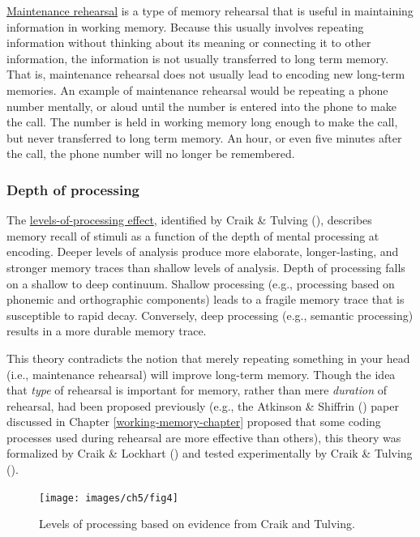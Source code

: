 \documentclass[
]{krantz}
\begin{document}
\hyperref[maintenance-rehearsal]{Maintenance rehearsal} is a type of memory rehearsal that is useful in maintaining information in working memory. Because this usually involves repeating information without thinking about its meaning or connecting it to other information, the information is not usually transferred to long term memory. That is, maintenance rehearsal does not usually lead to encoding new long-term memories. An example of maintenance rehearsal would be repeating a phone number mentally, or aloud until the number is entered into the phone to make the call. The number is held in working memory long enough to make the call, but never transferred to long term memory. An hour, or even five minutes after the call, the phone number will no longer be remembered.

\subsubsection*{Depth of processing}\label{depth-of-processing}


The \hyperref[levels-of-processing-effect]{levels-of-processing effect}, identified by Craik \& Tulving (), describes memory recall of stimuli as a function of the depth of mental processing at encoding. Deeper levels of analysis produce more elaborate, longer-lasting, and stronger memory traces than shallow levels of analysis. Depth of processing falls on a shallow to deep continuum. Shallow processing (e.g., processing based on phonemic and orthographic components) leads to a fragile memory trace that is susceptible to rapid decay. Conversely, deep processing (e.g., semantic processing) results in a more durable memory trace.

This theory contradicts the notion that merely repeating something in your head (i.e., maintenance rehearsal) will improve long-term memory. Though the idea that \emph{type} of rehearsal is important for memory, rather than mere \emph{duration} of rehearsal, had been proposed previously (e.g., the Atkinson \& Shiffrin () paper discussed in Chapter \ref{working-memory-chapter} proposed that some coding processes used during rehearsal are more effective than others), this theory was formalized by Craik \& Lockhart () and tested experimentally by Craik \& Tulving ().

\begin{figure}

{\centering \texttt{[image: images/ch5/fig4]} 

}

\caption{Levels of processing based on evidence from Craik and Tulving.}\label{fig:lop}
\end{figure}
\end{document}
